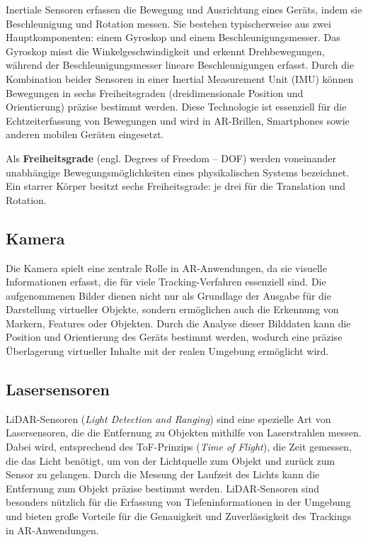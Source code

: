 Inertiale Sensoren erfassen die Bewegung und Ausrichtung eines Geräts, indem sie Beschleunigung und Rotation messen. Sie bestehen typischerweise aus zwei Hauptkomponenten: einem Gyroskop und einem Beschleunigungsmesser. Das Gyroskop misst die Winkelgeschwindigkeit und erkennt Drehbewegungen, während der Beschleunigungsmesser lineare Beschleunigungen erfasst. Durch die Kombination beider Sensoren in einer Inertial Measurement Unit (IMU) können Bewegungen in sechs Freiheitsgraden (dreidimensionale Position und Orientierung) präzise bestimmt werden. Diese Technologie ist essenziell für die Echtzeiterfassung von Bewegungen und wird in AR-Brillen, Smartphones sowie anderen mobilen Geräten eingesetzt. \cite{doerner2022virtual}

\begin{tcolorbox}[colback=THAi-Blue!20!white, colframe=THAi-Blue]
    Als \textbf{Freiheitsgrade} (engl. Degrees of Freedom – DOF) werden voneinander unabhängige Bewegungsmöglichkeiten eines physikalischen Systems bezeichnet. Ein starrer Körper besitzt sechs Freiheitsgrade: je drei für die Translation und Rotation. \cite{wikipedia2024dof}
\end{tcolorbox}  

\subsection{Kamera}

Die Kamera spielt eine zentrale Rolle in AR-Anwendungen, da sie visuelle Informationen erfasst, die für viele Tracking-Verfahren essenziell sind. Die aufgenommenen Bilder dienen nicht nur als Grundlage der Ausgabe für die Darstellung virtueller Objekte, sondern ermöglichen auch die Erkennung von Markern, Features oder Objekten. Durch die Analyse dieser Bilddaten kann die Position und Orientierung des Geräts bestimmt werden, wodurch eine präzise Überlagerung virtueller Inhalte mit der realen Umgebung ermöglicht wird. \cite{doerner2022virtual}

\subsection{Lasersensoren}\label{LiDAR}

LiDAR-Sensoren (\textit{Light Detection and Ranging}) sind eine spezielle Art von Lasersensoren, die die Entfernung zu Objekten mithilfe von Laserstrahlen messen. Dabei wird, entsprechend des ToF-Prinzips (\textit{Time of Flight}), die Zeit gemessen, die das Licht benötigt, um von der Lichtquelle zum Objekt und zurück zum Sensor zu gelangen. Durch die Messung der Laufzeit des Lichts kann die Entfernung zum Objekt präzise bestimmt werden. LiDAR-Sensoren sind besonders nützlich für die Erfassung von Tiefeninformationen in der Umgebung und bieten große Vorteile für die Genauigkeit und Zuverlässigkeit des Trackings in AR-Anwendungen. \cite{doerner2022virtual, ibm2024lidar}

